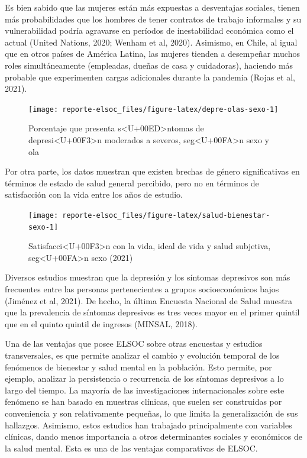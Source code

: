 \documentclass[
  12pt,
]{book}
\begin{document}
Es bien sabido que las mujeres están más expuestas a desventajas sociales, tienen más probabilidades que los hombres de tener contratos de trabajo informales y su vulnerabilidad podría agravarse en períodos de inestabilidad económica como el actual (United Nations, 2020; Wenham et al, 2020). Asimismo, en Chile, al igual que en otros países de América Latina, las mujeres tienden a desempeñar muchos roles simultáneamente (empleadas, dueñas de casa y cuidadoras), haciendo más probable que experimenten cargas adicionales durante la pandemia (Rojas et al, 2021).

\begin{figure}

{\centering \texttt{[image: reporte-elsoc\_files/figure-latex/depre-olas-sexo-1]} 

}

\caption{Porcentaje que presenta s<U+00ED>ntomas de depresi<U+00F3>n moderados a severos, seg<U+00FA>n sexo y ola}\label{fig:depre-olas-sexo}
\end{figure}

Por otra parte, los datos muestran que existen brechas de género significativas en términos de estado de salud general percibido, pero no en términos de satisfacción con la vida entre los años de estudio.

\begin{figure}

{\centering \texttt{[image: reporte-elsoc\_files/figure-latex/salud-bienestar-sexo-1]} 

}

\caption{Satisfacci<U+00F3>n con la vida, ideal de vida y salud subjetiva, seg<U+00FA>n sexo (2021)}\label{fig:salud-bienestar-sexo}
\end{figure}

Diversos estudios muestran que la depresión y los síntomas depresivos son más frecuentes entre las personas pertenecientes a grupos socioeconómicos bajos (Jiménez et al, 2021). De hecho, la última Encuesta Nacional de Salud muestra que la prevalencia de síntomas depresivos es tres veces mayor en el primer quintil que en el quinto quintil de ingresos (MINSAL, 2018).

Una de las ventajas que posee ELSOC sobre otras encuestas y estudios transversales, es que permite analizar el cambio y evolución temporal de los fenómenos de bienestar y salud mental en la población. Esto permite, por ejemplo, analizar la persistencia o recurrencia de los síntomas depresivos a lo largo del tiempo. La mayoría de las investigaciones internacionales sobre este fenómeno se han basado en muestras clínicas, que suelen ser construidas por conveniencia y son relativamente pequeñas, lo que limita la generalización de sus hallazgos. Asimismo, estos estudios han trabajado principalmente con variables clínicas, dando menos importancia a otros determinantes sociales y económicos de la salud mental. Esta es una de las ventajas comparativas de ELSOC.
\end{document}
